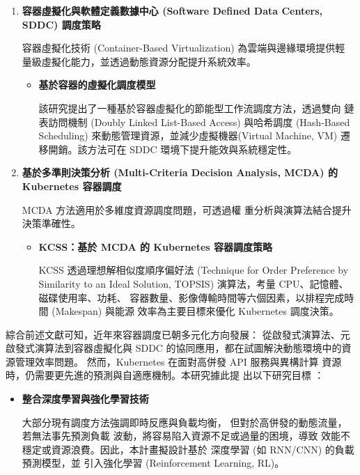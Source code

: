 \documentclass[12pt,a4paper]{article}
\begin{document}
\begin{enumerate}[label={(\zhdig*)}, leftmargin=2\parindent, listparindent=\parindent]
\begin{enumerate}[label={(\arabic*)}, leftmargin=\parindent, listparindent=\parindent]
\begin{enumerate}[label={(\zhdig*)}, leftmargin=\parindent, listparindent=\parindent]
\begin{itemize}[leftmargin=\parindent, listparindent=\parindent]
\end{itemize}
\item \textbf{
    容器虛擬化與軟體定義數據中心 (Software Defined Data Centers, SDDC) 調度策略
}

容器虛擬化技術 (Container-Based Virtualization) 為雲端與邊緣環境提供輕
量級虛擬化能力，並透過動態資源分配提升系統效率。
\begin{itemize}[leftmargin=\parindent, listparindent=\parindent]
    \item \textbf{\cite{16} 基於容器的虛擬化調度模型}

    該研究提出了一種基於容器虛擬化的節能型工作流調度方法，透過雙向
    鏈表訪問機制 (Doubly Linked List-Based Access) 與哈希調度 (Hash-Based
    Scheduling) 來動態管理資源，並減少虛擬機器(Virtual Machine, VM)
    遷移開銷。該方法可在 SDDC 環境下提升能效與系統穩定性。

\end{itemize}
\item \textbf{基於多準則決策分析 (Multi-Criteria Decision Analysis, MCDA)
    的 Kubernetes 容器調度}

MCDA 方法適用於多維度資源調度問題，可透過權
重分析與演算法結合提升決策準確性。
\begin{itemize}[leftmargin=\parindent, listparindent=\parindent]
    \item \textbf{\cite{17} KCSS：基於 MCDA 的 Kubernetes 容器調度策略}

    KCSS 透過理想解相似度順序偏好法
    (Technique for Order Preference by Similarity to an Ideal Solution,
    TOPSIS) 演算法，考量 CPU、記憶體、磁碟使用率、功耗、
    容器數量、影像傳輸時間等六個因素，以排程完成時間 (Makespan) 與能源
    效率為主要目標來優化 Kubernetes 調度決策。

\end{itemize}

\end{enumerate}

綜合前述文獻可知，近年來容器調度已朝多元化方向發展：
從啟發式演算法、元啟發式演算法到容器虛擬化與 SDDC
的協同應用，都在試圖解決動態環境中的資源管理效率問題。
然而，Kubernetes 在面對高併發 API 服務與異構計算
資源時，仍需要更先進的預測與自適應機制。本研究據此提
出以下研究目標 ：
\begin{itemize}[leftmargin=\parindent, listparindent=\parindent]
    \item\textbf{整合深度學習與強化學習技術}

大部分現有調度方法強調即時反應與負載均衡，
但對於高併發的動態流量，若無法事先預測負載
波動，將容易陷入資源不足或過量的困境，導致
效能不穩定或資源浪費。因此，本計畫擬設計基於
深度學習 (如 RNN/CNN) 的負載預測模型，並
引入強化學習 (Reinforcement Learning, RL)。


\end{itemize}
\end{enumerate}
\end{enumerate}
\end{document}
